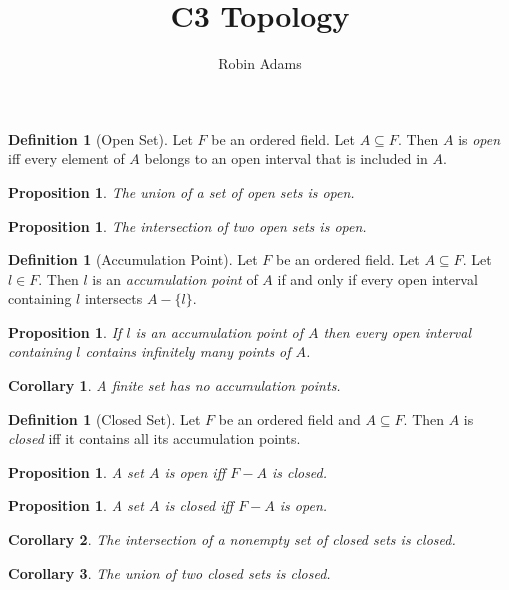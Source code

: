 \documentclass{article}
\title{C3 Topology}
\author{Robin Adams}
\newtheorem{proposition}[axiom]{Proposition}
\newtheorem{corollary}{Corollary}[axiom]
\theoremstyle{definition}
\newtheorem{definition}[axiom]{Definition}
\begin{document}
\begin{definition}[Open Set]
    Let $F$ be an ordered field. Let $A \subseteq F$. Then $A$ is \emph{open} iff every element of $A$ belongs to an open interval that is
    included in $A$.
\end{definition}

\begin{proposition}
    The union of a set of open sets is open.
\end{proposition}

\begin{proposition}
    The intersection of two open sets is open.
\end{proposition}

\begin{definition}[Accumulation Point]
    Let $F$ be an ordered field. Let $A \subseteq F$. Let $l \in F$. Then $l$ is an \emph{accumulation point} of $A$ if and only if
    every open interval containing $l$ intersects $A - \{ l \}$.
\end{definition}

\begin{proposition}
    If $l$ is an accumulation point of $A$ then every open interval containing $l$ contains infinitely many points of $A$.
\end{proposition}

\begin{corollary}
    A finite set has no accumulation points.
\end{corollary}

\begin{definition}[Closed Set]
    Let $F$ be an ordered field and $A \subseteq F$. Then $A$ is \emph{closed} iff it contains all its accumulation points.
\end{definition}

\begin{proposition}
    A set $A$ is open iff $F - A$ is closed.
\end{proposition}

\begin{proposition}
    A set $A$ is closed iff $F - A$ is open.
\end{proposition}

\begin{corollary}
    The intersection of a nonempty set of closed sets is closed.
\end{corollary}

\begin{corollary}
    The union of two closed sets is closed.
\end{corollary}
\end{document}

